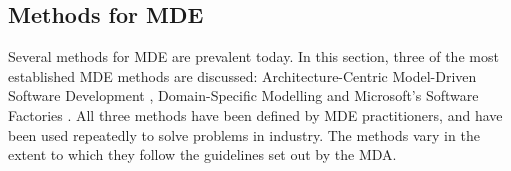 % 
% 
% 
% 


\subsection{Methods for MDE}
Several methods for MDE are prevalent today. In this section, three of the most established MDE methods are discussed: Architecture-Centric Model-Driven Software Development \cite{stahl06mdsd}, Domain-Specific Modelling \cite{kelly08dsm} and Microsoft's Software Factories \cite{greenfield04software}. All three methods have been defined by MDE practitioners, and have been used repeatedly to solve problems in industry. The methods vary in the extent to which they follow the guidelines set out by the MDA.

